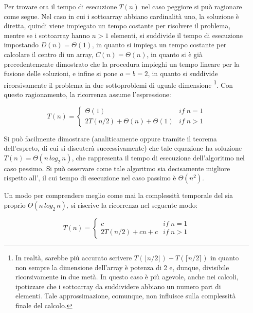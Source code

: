 Per trovare ora il tempo di esecuzione \(T(n)\) nel caso peggiore si può ragionare come segue. Nel caso in cui i sottoarray abbiano cardinalità uno, la soluzione è diretta, quindi viene impiegato un tempo costante per risolvere il problema, mentre se i sottoarray hanno \(n > 1\) elementi, si suddivide il tempo di esecuzione impostando \(D(n) = \Theta(1)\), in quanto si impiega un tempo costante per calcolare il centro di un array, \(C(n)=\Theta(n)\), in quanto si è già precedentemente dimostrato che la procedura  impieghi un tempo lineare per la fusione delle soluzioni, e infine si pone \(a=b=2\), in quanto si suddivide ricorsivamente il problema in due sottoproblemi di uguale dimensione \footnote{In realtà, sarebbe più accurato scrivere \(T(\lfloor n/2 \rfloor) + T(\lceil n/2 \rceil)\) in quanto non sempre la dimensione dell'array  è potenza di 2 e, dunque, divisibile ricorsivamente in due metà. In questo caso è più agevole, anche nei calcoli, ipotizzare che i sottoarray da suddividere abbiano un numero pari di elementi. Tale approssimazione, comunque, non influisce sulla complessità finale del calcolo.}. Con questo ragionamento, la ricorrenza assume l'espressione:

\begin{equation*}
  T(n)=\begin{cases}
    \Theta(1) & if\; n=1\\
    2T(n/2)+\Theta(n)+\Theta(1) & if\; n>1
  \end{cases}
\end{equation*}

Si può facilmente dimostrare (analiticamente oppure tramite il teorema dell'espreto, di cui si discuterà successivamente) che tale equazione ha soluzione \(T(n)=\Theta(n\,log_2\,n)\), che rappresenta il tempo di esecuzione dell'algoritmo  nel caso pessimo. Si può osservare come tale algoritmo sia decisamente migliore rispetto all', il cui tempo di esecuzione nel caso passimo è \(\Theta(n^2)\).

Un modo per comprendere meglio come mai la complessità temporale del  sia proprio \(\Theta(n\,log_2\,n)\), si riscrive la ricorrenza nel seguente modo:

\begin{equation*}
  T(n)=\begin{cases}
    c & if\; n=1\\
    2T(n/2)+cn+c & if\; n>1
  \end{cases}
\end{equation*}

